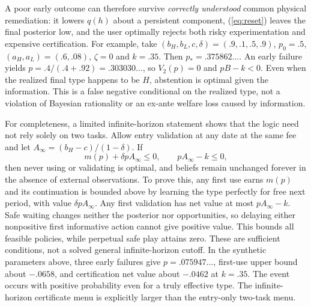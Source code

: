 \documentclass[11pt]{article}
\begin{document}
A poor early outcome can therefore survive \emph{correctly understood} common physical remediation: it lowers $q(h)$ about a persistent component, (\ref{eq:reset}) leaves the final posterior low, and the user optimally rejects both risky experimentation and expensive certification. For example, take $(b_H,b_L,c,\delta)=(.9,.1,.5,.9)$, $p_0=.5$, $(a_H,a_L)=(.6,.08)$, $\zeta=0$ and $k=.35$. Then $p_*=.375862\ldots$. An early failure yields $p=.4/(.4+.92)=.303030\ldots$, so $V_2(p)=0$ and $pB-k<0$. Even when the realized final type happens to be $H$, abstention is optimal given the information. This is a false negative conditional on the realized type, not a violation of Bayesian rationality or an ex-ante welfare loss caused by information.

For completeness, a limited infinite-horizon statement shows that the logic need not rely solely on two tasks. Allow entry validation at any date at the same fee and let $A_\infty=(b_H-c)/(1-\delta)$. If
\begin{equation}
 m(p)+\delta pA_\infty\leq0,\qquad pA_\infty-k\leq0,\label{eq:infbound}
\end{equation}
then never using or validating is optimal, and beliefs remain unchanged forever in the absence of external observations. To prove this, any first use earns $m(p)$ and its continuation is bounded above by learning the type perfectly for free next period, with value $\delta pA_\infty$. Any first validation has net value at most $pA_\infty-k$. Safe waiting changes neither the posterior nor opportunities, so delaying either nonpositive first informative action cannot give positive value. This bounds all feasible policies, while perpetual safe play attains zero. These are sufficient conditions, not a solved general infinite-horizon cutoff. In the synthetic parameters above, three early failures give $p=.075947\ldots$, first-use upper bound about $-.0658$, and certification net value about $-.0462$ at $k=.35$. The event occurs with positive probability even for a truly effective type. The infinite-horizon certificate menu is explicitly larger than the entry-only two-task menu.
\end{document}
